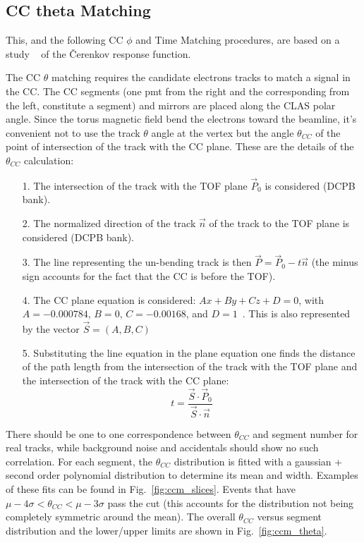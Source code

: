 \clearpage\newpage

\subsection{CC theta Matching}\label{subsec:cc-theta-matching}

This, and the following CC $\phi$ and Time Matching procedures, are based on a study
~\cite{bib:ccmatch, bib:pc_fxpun,bib:pc_osi} of the \v Cerenkov response function.

The CC $\theta$ matching requires the candidate electrons tracks to match
a signal in the CC. The CC segments (one pmt from the right and the corresponding from the left,
constitute a segment) and mirrors are placed along the CLAS polar angle.
Since the torus magnetic field bend the electrons toward the beamline, it's convenient
not to use the track $\theta$ angle at the vertex but the angle $\theta_{CC}$ of the point of
intersection of the track with the CC plane.
These are the details of the  $\theta_{CC}$ calculation:
\begin{itemize}
    \item [1.] The intersection of the track with the TOF plane  $\vec{P}_0$ is considered (DCPB bank).
    \item [2.] The normalized direction of the track $\vec{n}$ of the track to the TOF plane is considered (DCPB bank).
    \item [3.] The line representing the un-bending track is then $\vec{P} = \vec{P}_0 - t\vec{n}$
    (the minus sign accounts for the fact that the CC is before the TOF).
    \item [4.] The CC plane equation is considered: $Ax+By+Cz+D=0$, with
    $A=-0.000784$, $B=0$, $C=-0.00168$, and $D=1$~\cite{bib:ccmatch}.
    This is also represented by the vector $\vec{S} = (A, B, C)$
    \item [5.] Substituting the line equation in the plane equation one finds the distance of the path length from the
    intersection of the track with the TOF plane and the intersection of the track with the CC plane:
    \[t=\frac{\vec{S} \cdot \vec{P}_0}{\vec{S} \cdot \vec{n}}\]
\end{itemize}
There should be one to one correspondence between $\theta_{CC}$ and segment number for real tracks, while
background noise and accidentals should show no such correlation.
For each segment, the $\theta_{CC}$ distribution is fitted with a gaussian + second order
polynomial distribution to determine its mean and width.
Examples of these fits can be found in Fig.~\ref{fig:ccm_slices}.
Events that have $\mu - 4\sigma < \theta_{CC} < \mu - 3\sigma$ pass the cut (this accounts for the distribution
not being completely symmetric around the mean).
The overall $\theta_{CC}$ versus segment distribution and the lower/upper limits
are shown in Fig.~\ref{fig:ccm_theta}.

